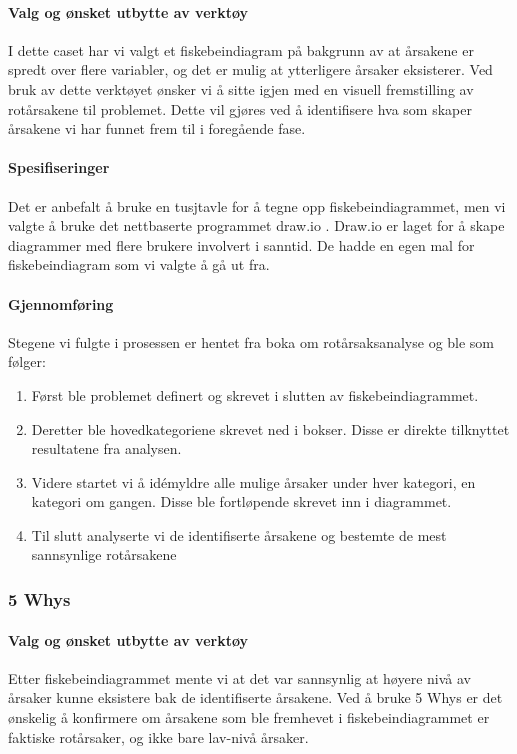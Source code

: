 \paragraph{Valg og ønsket utbytte av verktøy}
I dette caset har vi valgt et fiskebeindiagram på bakgrunn av at årsakene er spredt over flere variabler, og det er mulig at ytterligere årsaker eksisterer. Ved bruk av dette verktøyet ønsker vi å sitte igjen med en visuell fremstilling av rotårsakene til problemet. Dette vil gjøres ved å identifisere hva som skaper årsakene vi har funnet frem til i foregående fase. 

\paragraph{Spesifiseringer}
Det er anbefalt å bruke en tusjtavle for å tegne opp fiskebeindiagrammet, men vi valgte å bruke det nettbaserte programmet draw.io \cite{drawio}. Draw.io er laget for å skape diagrammer med flere brukere involvert i sanntid. De hadde en egen mal for fiskebeindiagram som vi valgte å gå ut fra.

\paragraph{Gjennomføring}
Stegene vi fulgte i prosessen er hentet fra boka om rotårsaksanalyse \cite{RCA} og ble som følger:

\begin{enumerate}
    \item Først ble problemet definert og skrevet i slutten av fiskebeindiagrammet.
    \item Deretter ble hovedkategoriene skrevet ned i bokser. Disse er direkte tilknyttet resultatene fra analysen.
    \item Videre startet vi å idémyldre alle mulige årsaker under hver kategori, en kategori om gangen. Disse ble fortløpende skrevet inn i diagrammet.
    \item Til slutt analyserte vi de identifiserte årsakene og bestemte de mest sannsynlige rotårsakene
\end{enumerate}


\subsubsection{5 Whys}

\paragraph{Valg og ønsket utbytte av verktøy}
Etter fiskebeindiagrammet mente vi at det var sannsynlig at høyere nivå av årsaker kunne eksistere bak de identifiserte årsakene. Ved å bruke 5 Whys er det ønskelig å konfirmere om årsakene som ble fremhevet i fiskebeindiagrammet er faktiske rotårsaker, og ikke bare lav-nivå årsaker. 

